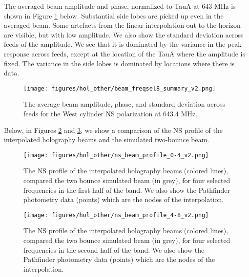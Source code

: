 The averaged beam amplitude and phase, normalized to TauA at 643 MHz is shown in Figure \ref{example} below. Substantial side lobes are picked up even in the averaged beam. Some artefacts from the linear interpolation out to the horizon are visible, but with low amplitude. We also show the standard deviation across feeds of the amplitude. We see that it is dominated by the variance in the peak response across feeds, except at the location of the TauA where the amplitude is fixed. The variance in the side lobes is dominated by locations where there is data.

\begin{figure}[h!]
\begin{center}
\texttt{[image: figures/hol\_other/beam\_freqsel8\_summary\_v2.png]}
\caption{The average beam amplitude, phase, and standard deviation across feeds for the West cylinder NS polarization at 643.4 MHz.\label{example}}
\end{center}
\end{figure}

Below, in Figures \ref{nsprof0} and \ref{nsprof1}, we show a comparison of the NS profile of the interpolated holography beams and the simulated two-bounce beam.

\begin{figure}[h!]
\begin{center}
\texttt{[image: figures/hol\_other/ns\_beam\_profile\_0-4\_v2.png]}
\caption{The NS profile of the interpolated holography beams (colored lines), compared the two bounce simulated beam (in grey), for four selected frequencies in the first half of the band. We also show the Pathfinder photometry data (points) which are the nodes of the interpolation. \label{nsprof0}}
\end{center}
\end{figure}

\begin{figure}[h!]
\begin{center}
\texttt{[image: figures/hol\_other/ns\_beam\_profile\_4-8\_v2.png]}
\caption{The NS profile of the interpolated holography beams (colored lines), compared the two bounce simulated beam (in grey), for four selected frequencies in the second half of the band. We also show the Pathfinder photometry data (points) which are the nodes of the interpolation. \label{nsprof1}}
\end{center}
\end{figure}


